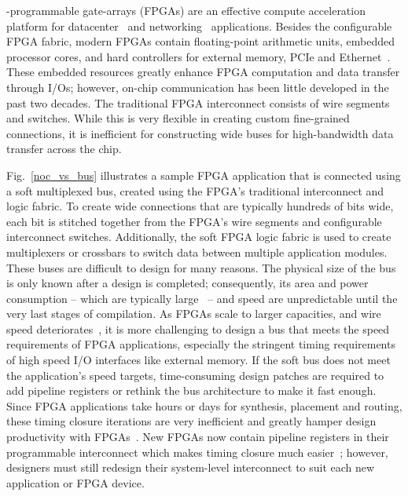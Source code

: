 
-programmable gate-arrays (FPGAs) are an effective compute acceleration platform for datacenter~\cite{Putnam2014} and networking~\cite{lockwood} applications.
Besides the configurable FPGA fabric, modern FPGAs contain floating-point arithmetic units, embedded processor cores, and hard controllers for external memory, PCIe and Ethernet~\cite{Langhammer15}.
These embedded resources greatly enhance FPGA computation and data transfer through I/Os; however, on-chip communication has been little developed in the past two decades.
The traditional FPGA interconnect consists of wire segments and switches.
While this is very flexible in creating custom fine-grained connections, it is inefficient for constructing wide buses for high-bandwidth data transfer across the chip.

%
%

Fig.~\ref{noc_vs_bus} illustrates a sample FPGA application that is connected using a soft multiplexed bus, created using the FPGA's traditional interconnect and logic fabric.
To create wide connections that are typically hundreds of bits wide, each bit is stitched together from the FPGA's wire segments and configurable interconnect switches.
Additionally, the soft FPGA logic fabric is used to create multiplexers or crossbars to switch data between multiple application modules.
These buses are difficult to design for many reasons.
The physical size of the bus is only known after a design is completed; consequently, its area and power consumption -- which are typically large~\cite{tvlsi} -- and speed are unpredictable until the very last stages of compilation.
As FPGAs scale to larger capacities, and wire speed deteriorates~\cite{Ho2001}, it is more challenging to design a bus that meets the speed requirements of FPGA applications, especially the stringent timing requirements of high speed I/O interfaces like external memory.
If the soft bus does not meet the application's speed targets, time-consuming design patches are required to add pipeline registers or rethink the bus architecture to make it fast enough.
Since FPGA applications take hours or days for synthesis, placement and routing, these timing closure iterations are very inefficient and greatly hamper design productivity with FPGAs~\cite{micro}.
New FPGAs now contain pipeline registers in their programmable interconnect which makes timing closure much easier~\cite{stratix10}; however, designers must still redesign their system-level interconnect to suit each new application or FPGA device.


